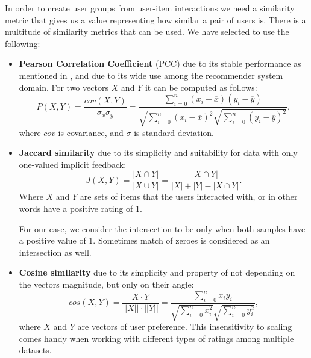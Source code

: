 In order to create user groups from user-item interactions we need a similarity metric that gives us a value representing how similar a pair of users is. There is a multitude of similarity metrics that can be used. We have selected to use the following: 
\begin{itemize}
    \item 
        \textbf{Pearson Correlation Coefficient} (PCC) due to its stable performance as mentioned in \cite{similarity_measures_comparason},  and due to its wide use among the recommender system domain.
        For two vectors $X$ and $Y$ it can be computed as follows:
        \begin{equation}
            P(X,Y) = \frac{cov(X,Y)}{\sigma_x \sigma_y}
            = \frac{\sum\limits_{i=0}^{n} (x_i - \overline{x})(y_i - \overline{y})}{\sqrt{\sum\limits_{i=0}^{n} (x_i - \overline{x})^2}\sqrt{\sum\limits_{i=0}^{n}(y_i - \overline{y})^2}},
        \end{equation}
        where $cov$ is covariance, and $\sigma$ is standard deviation.
        
        
    \item
        \textbf{Jaccard similarity} due to its simplicity and suitability for data with only one-valued implicit feedback:
        \begin{equation}
            J(X,Y) = \frac{|X \cap Y|}{|X \cup Y|} = \frac{|X \cap Y|}{|X| + |Y| - |X \cap Y|}.
        \end{equation}
        Where $X$ and $Y$ are sets of items that the users interacted with, or in other words have a positive rating of 1.
        
        For our case, we consider the intersection to be only when both samples have a positive value of 1. Sometimes match of zeroes is considered as an intersection as well.
        
    \item
        \textbf{Cosine similarity} due to its simplicity and property of not depending on the vectors magnitude, but only on their angle:
        \begin{equation}
            cos(X, Y) = \frac {X \cdot Y}{||X|| \cdot ||Y||}
             = \frac{\sum\limits_{i=0}^{n}{x_i y_i}} {\sqrt{\sum\limits_{i=0}^{n}{x_i^2}}\sqrt{\sum\limits_{i=0}^{n}{y_i^2}}}
            ,
        \end{equation}
        where $X$ and $Y$ are vectors of user preference.
        This insensitivity to scaling comes handy when working with different types of ratings among multiple datasets.
\end{itemize}


